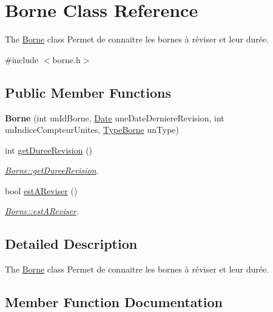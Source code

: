 \hypertarget{class_borne}{}\section{Borne Class Reference}
\label{class_borne}


The \hyperlink{class_borne}{Borne} class Permet de connaitre les bornes à réviser et leur durée.  




{\ttfamily \#include $<$borne.\+h$>$}

\subsection*{Public Member Functions}
\begin{DoxyCompactItemize}
\item 
\mbox{\label{class_borne_aba0be924c6cb39fe8cdeffe27407fc3f}} 
{\bfseries Borne} (int un\+Id\+Borne, \hyperlink{class_date}{Date} une\+Date\+Derniere\+Revision, int un\+Indice\+Compteur\+Unites, \hyperlink{class_type_borne}{Type\+Borne} un\+Type)
\item 
int \hyperlink{class_borne_aba8f90c81ef4efbe239e67e12015bb44}{get\+Duree\+Revision} ()
\begin{DoxyCompactList}\small\item\em \hyperlink{class_borne_aba8f90c81ef4efbe239e67e12015bb44}{Borne\+::get\+Duree\+Revision}. \end{DoxyCompactList}\item 
bool \hyperlink{class_borne_a40c1a1a990a10b8bc1421a1a39b7300a}{est\+A\+Reviser} ()
\begin{DoxyCompactList}\small\item\em \hyperlink{class_borne_a40c1a1a990a10b8bc1421a1a39b7300a}{Borne\+::est\+A\+Reviser}. \end{DoxyCompactList}\end{DoxyCompactItemize}


\subsection{Detailed Description}
The \hyperlink{class_borne}{Borne} class Permet de connaitre les bornes à réviser et leur durée. 

\subsection{Member Function Documentation}
\mbox{\label{class_borne_a40c1a1a990a10b8bc1421a1a39b7300a}} 

